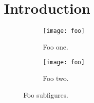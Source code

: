 \section{Introduction}
\label{introduction}

\lipsum[1]

\begin{figure}[!h]

\begin{subfigure}{\columnwidth}
\texttt{[image: foo]} 
\caption{Foo one.}
\label{fig:foo_sub_one}
\end{subfigure}

\begin{subfigure}{\columnwidth}
\texttt{[image: foo]}
\caption{Foo two.}
\label{fig:foo_sub_two}
\end{subfigure}
 
\caption{Foo subfigures.}
\label{fig:foo_sub}
\end{figure}

\lipsum[1-2]



